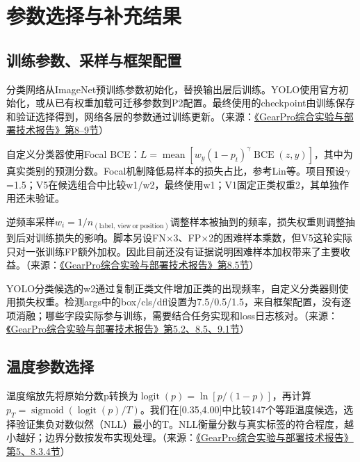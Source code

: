 
\FloatBarrier{}\section{参数选择与补充结果}
\FloatBarrier{}\subsection{训练参数、采样与框架配置}
分类网络从ImageNet预训练参数初始化，替换输出层后训练。YOLO使用官方初始化，或从已有权重加载可迁移参数到P2配置。最终使用的checkpoint由训练保存和验证选择得到，网络各层的参数通过训练更新。（来源：\protect\href{run:../GearPro_综合技术报告_Markdown含配图/GearPro_综合实验与部署技术报告.md}{《GearPro综合实验与部署技术报告》第8--9节}）

自定义分类器使用Focal BCE：$L=\operatorname{mean}[w_y(1-p_t)^\gamma\operatorname{BCE}(z,y)]$，其中为真实类别的预测分数。Focal机制降低易样本的损失占比，参考Lin等\cite{ref13}。项目预设\ensuremath{\gamma}=1.5；V5在候选组合中比较w1/w2，最终使用w1；V1固定正类权重2，其单独作用还未验证。

逆频率采样$w_i=1/n_{(\mathrm{label},\,\mathrm{view\ or\ position})}$调整样本被抽到的频率，损失权重则调整抽到后对训练损失的影响。脚本另设FN\ensuremath{\times}3、FP\ensuremath{\times}2的困难样本乘数，但V5这轮实际只对一张训练FP额外加权。因此目前还没有证据说明困难样本加权带来了主要收益。（来源：\protect\href{run:../GearPro_综合技术报告_Markdown含配图/GearPro_综合实验与部署技术报告.md}{《GearPro综合实验与部署技术报告》第8.5节}）

YOLO分类候选的w2通过复制正类文件增加正类的出现频率，自定义分类器则使用损失权重。检测args中的box/cls/dfl设置为7.5/0.5/1.5，来自框架配置，没有逐项消融；哪些字段实际参与训练，需要结合任务实现和loss日志核对。（来源：\protect\href{run:../GearPro_综合技术报告_Markdown含配图/GearPro_综合实验与部署技术报告.md}{《GearPro综合实验与部署技术报告》第5.2、8.5、9.1节}）

\FloatBarrier{}\subsection{温度参数选择}
温度缩放先将原始分数p转换为$\operatorname{logit}(p)=\ln[p/(1-p)]$，再计算$p_T=\operatorname{sigmoid}(\operatorname{logit}(p)/T)$。我们在[0.35,4.00]中比较147个等距温度候选，选择验证集负对数似然（NLL）最小的T。NLL衡量分数与真实标签的符合程度，越小越好；边界分数按发布实现处理。（来源：\protect\href{run:../GearPro_综合技术报告_Markdown含配图/GearPro_综合实验与部署技术报告.md}{《GearPro综合实验与部署技术报告》第5、8.3.4节}）

